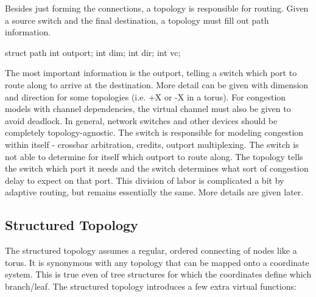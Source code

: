 Besides just forming the connections, a topology is responsible for routing.
Given a source switch and the final destination, a topology must fill out path information.

\begin{CppCode}
struct path {
  int outport;
  int dim;
  int dir;
  int vc;
}
\end{CppCode}

The most important information is the outport, telling a switch which port to route along to arrive at the destination.
More detail can be given with dimension and direction for some topologies (i.e. +X or -X in a torus).
For congestion models with channel dependencies, the virtual channel must also be given to avoid deadlock.
In general, network switches and other devices should be completely topology-agnostic.
The switch is responsible for modeling congestion within itself - crossbar arbitration, credits, outport multiplexing.
The switch is not able to determine for itself which outport to route along.
The topology tells the switch which port it needs and the switch determines what sort of congestion delay to expect on that port.
This division of labor is complicated a bit by adaptive routing, but remains essentially the same.  More details are given later.

\subsection{Structured Topology}

The structured topology assumes a regular, ordered connecting of nodes like a torus.
It is synonymous with any topology that can be mapped onto a coordinate system.
This is true even of tree structures for which the coordinates define which branch/leaf.
The structured topology introduces a few extra virtual functions:

